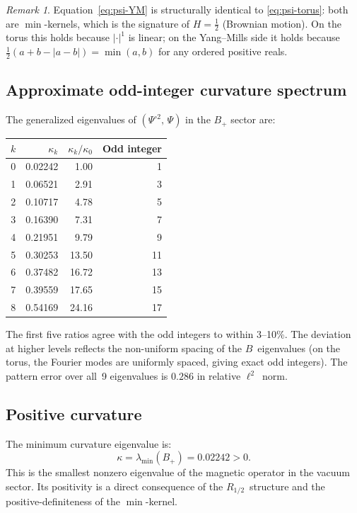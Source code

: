 \documentclass[11pt,a4paper]{article}
\theoremstyle{plain}
\theoremstyle{definition}
\theoremstyle{remark}
\newtheorem{remark}[theorem]{Remark}
\begin{document}
\begin{remark}
Equation~\eqref{eq:psi-YM} is structurally identical to
\eqref{eq:psi-torus}: both are $\min$-kernels, which is the signature
of $H = \tfrac{1}{2}$ (Brownian motion).  On the torus this holds
because $|\cdot|^1$ is linear; on the Yang--Mills side it holds because
$\tfrac{1}{2}(a+b-|a-b|) = \min(a,b)$ for any ordered positive reals.
\end{remark}

\subsection{Approximate odd-integer curvature spectrum}

The generalized eigenvalues of $(\Psi^{\circ 2},\,\Psi)$ in the $B_+$
sector are:

\begin{center}
\begin{tabular}{c r r r}
\toprule
$k$ & $\kappa_k$ & $\kappa_k / \kappa_0$ & Odd integer \\
\midrule
0 & 0.02242 & 1.00 & 1 \\
1 & 0.06521 & 2.91 & 3 \\
2 & 0.10717 & 4.78 & 5 \\
3 & 0.16390 & 7.31 & 7 \\
4 & 0.21951 & 9.79 & 9 \\
5 & 0.30253 & 13.50 & 11 \\
6 & 0.37482 & 16.72 & 13 \\
7 & 0.39559 & 17.65 & 15 \\
8 & 0.54169 & 24.16 & 17 \\
\bottomrule
\end{tabular}
\end{center}

The first five ratios agree with the odd integers to within 3--10\%.
The deviation at higher levels reflects the non-uniform spacing of the
$B$~eigenvalues (on the torus, the Fourier modes are uniformly spaced,
giving exact odd integers).  The pattern error over all~9 eigenvalues is
$0.286$ in relative $\ell^2$~norm.

\subsection{Positive curvature}

The minimum curvature eigenvalue is:
\begin{equation}
  \boxed{\kappa = \lambda_{\min}(B_+) = 0.02242 > 0.}
\end{equation}
This is the smallest nonzero eigenvalue of the magnetic operator in the
vacuum sector.  Its positivity is a direct consequence of the
$R_{1/2}$~structure and the positive-definiteness of the $\min$-kernel.
\end{document}

